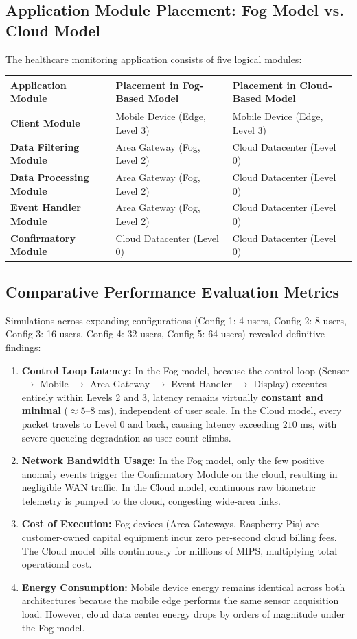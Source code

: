\subsection{Application Module Placement: Fog Model vs. Cloud Model}
The healthcare monitoring application consists of five logical modules:
\begin{center}
\begin{tabularx}{\textwidth}{>{\bfseries}l X X}
\toprule
Application Module & Placement in Fog-Based Model & Placement in Cloud-Based Model\\
\midrule
Client Module & Mobile Device (Edge, Level 3) & Mobile Device (Edge, Level 3)\\
Data Filtering Module & Area Gateway (Fog, Level 2) & Cloud Datacenter (Level 0)\\
Data Processing Module & Area Gateway (Fog, Level 2) & Cloud Datacenter (Level 0)\\
Event Handler Module & Area Gateway (Fog, Level 2) & Cloud Datacenter (Level 0)\\
Confirmatory Module & Cloud Datacenter (Level 0) & Cloud Datacenter (Level 0)\\
\bottomrule
\end{tabularx}
\end{center}

\subsection{Comparative Performance Evaluation Metrics}
Simulations across expanding configurations (Config 1: 4 users, Config 2: 8 users, Config 3: 16 users, Config 4: 32 users, Config 5: 64 users) revealed definitive findings:
\begin{enumerate}[leftmargin=*]
  \item \textbf{Control Loop Latency:} In the Fog model, because the control loop (Sensor $\to$ Mobile $\to$ Area Gateway $\to$ Event Handler $\to$ Display) executes entirely within Levels 2 and 3, latency remains virtually \textbf{constant and minimal} ($\approx 5\text{--}8\text{ ms}$), independent of user scale. In the Cloud model, every packet travels to Level 0 and back, causing latency exceeding $210\text{ ms}$, with severe queueing degradation as user count climbs.
  \item \textbf{Network Bandwidth Usage:} In the Fog model, only the few positive anomaly events trigger the Confirmatory Module on the cloud, resulting in negligible WAN traffic. In the Cloud model, continuous raw biometric telemetry is pumped to the cloud, congesting wide-area links.
  \item \textbf{Cost of Execution:} Fog devices (Area Gateways, Raspberry Pis) are customer-owned capital equipment incur zero per-second cloud billing fees. The Cloud model bills continuously for millions of MIPS, multiplying total operational cost.
  \item \textbf{Energy Consumption:} Mobile device energy remains identical across both architectures because the mobile edge performs the same sensor acquisition load. However, cloud data center energy drops by orders of magnitude under the Fog model.
\end{enumerate}

